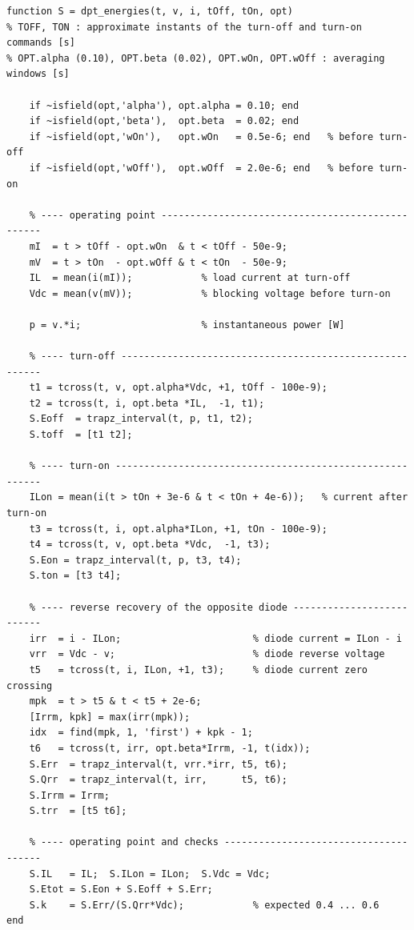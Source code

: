 \begin{lstlisting}[caption={Operating point and switching energies.}]
function S = dpt_energies(t, v, i, tOff, tOn, opt)
% TOFF, TON : approximate instants of the turn-off and turn-on commands [s]
% OPT.alpha (0.10), OPT.beta (0.02), OPT.wOn, OPT.wOff : averaging windows [s]

    if ~isfield(opt,'alpha'), opt.alpha = 0.10; end
    if ~isfield(opt,'beta'),  opt.beta  = 0.02; end
    if ~isfield(opt,'wOn'),   opt.wOn   = 0.5e-6; end   % before turn-off
    if ~isfield(opt,'wOff'),  opt.wOff  = 2.0e-6; end   % before turn-on

    % ---- operating point -------------------------------------------------
    mI  = t > tOff - opt.wOn  & t < tOff - 50e-9;
    mV  = t > tOn  - opt.wOff & t < tOn  - 50e-9;
    IL  = mean(i(mI));            % load current at turn-off
    Vdc = mean(v(mV));            % blocking voltage before turn-on

    p = v.*i;                     % instantaneous power [W]

    % ---- turn-off --------------------------------------------------------
    t1 = tcross(t, v, opt.alpha*Vdc, +1, tOff - 100e-9);
    t2 = tcross(t, i, opt.beta *IL,  -1, t1);
    S.Eoff  = trapz_interval(t, p, t1, t2);
    S.toff  = [t1 t2];

    % ---- turn-on ---------------------------------------------------------
    ILon = mean(i(t > tOn + 3e-6 & t < tOn + 4e-6));   % current after turn-on
    t3 = tcross(t, i, opt.alpha*ILon, +1, tOn - 100e-9);
    t4 = tcross(t, v, opt.beta *Vdc,  -1, t3);
    S.Eon = trapz_interval(t, p, t3, t4);
    S.ton = [t3 t4];

    % ---- reverse recovery of the opposite diode --------------------------
    irr  = i - ILon;                       % diode current = ILon - i
    vrr  = Vdc - v;                        % diode reverse voltage
    t5   = tcross(t, i, ILon, +1, t3);     % diode current zero crossing
    mpk  = t > t5 & t < t5 + 2e-6;
    [Irrm, kpk] = max(irr(mpk));
    idx  = find(mpk, 1, 'first') + kpk - 1;
    t6   = tcross(t, irr, opt.beta*Irrm, -1, t(idx));
    S.Err  = trapz_interval(t, vrr.*irr, t5, t6);
    S.Qrr  = trapz_interval(t, irr,      t5, t6);
    S.Irrm = Irrm;
    S.trr  = [t5 t6];

    % ---- operating point and checks --------------------------------------
    S.IL   = IL;  S.ILon = ILon;  S.Vdc = Vdc;
    S.Etot = S.Eon + S.Eoff + S.Err;
    S.k    = S.Err/(S.Qrr*Vdc);            % expected 0.4 ... 0.6
end
\end{lstlisting}


